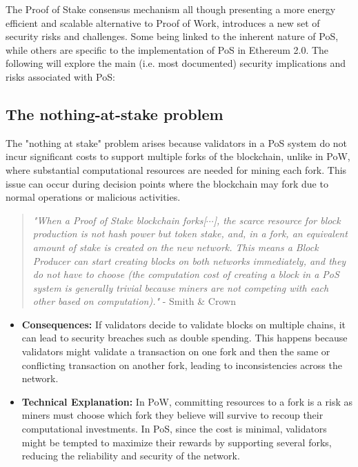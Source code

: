 The Proof of Stake consensus mechanism all though presenting a more energy efficient and scalable alternative to Proof of Work, introduces a new set of security risks and challenges. Some being linked to the inherent nature of PoS, while others are specific to the implementation of PoS in Ethereum 2.0. The following will explore the main (i.e. most documented) security implications and risks associated with PoS:

\subsection{The nothing-at-stake problem}
The "nothing at stake" problem arises because validators in a PoS system do not incur significant costs to support multiple forks of the blockchain, unlike in PoW, where substantial computational resources are needed for mining each fork. This issue can occur during decision points where the blockchain may fork due to normal operations or malicious activities.

\begin{quote}
    \textit{"When a Proof of Stake blockchain forks[$\cdots$], the scarce resource for block production is not hash power but token stake, and, in a fork, an equivalent amount of stake is created on the new network. This means a Block Producer can start creating blocks on both networks immediately, and they do not have to choose (the computation cost of creating a block in a PoS system is generally trivial because miners are not competing with each other based on computation)."} - Smith \& Crown \cite{nas_quote}
\end{quote}

\begin{itemize}
    \item \textbf{Consequences:} If validators decide to validate blocks on multiple chains, it can lead to security breaches such as double spending. This happens because validators might validate a transaction on one fork and then the same or conflicting transaction on another fork, leading to inconsistencies across the network.
    \item \textbf{Technical Explanation:} In PoW, committing resources to a fork is a risk as miners must choose which fork they believe will survive to recoup their computational investments. In PoS, since the cost is minimal, validators might be tempted to maximize their rewards by supporting several forks, reducing the reliability and security of the network.
\end{itemize}

